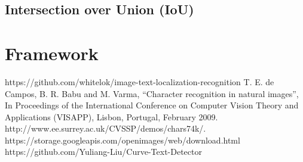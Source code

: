 \documentclass[conference]{IEEEtran}
\begin{document}
\subsection{Intersection over Union (IoU)}

\section{Framework}

\begin{thebibliography}{00}
 https://github.com/whitelok/image-text-localization-recognition
 T. E. de Campos, B. R. Babu and M. Varma, ``Character recognition in natural images'', In Proceedings of the International Conference on Computer Vision Theory and Applications (VISAPP), Lisbon, Portugal, February 2009. http://www.ee.surrey.ac.uk/CVSSP/demos/chars74k/.
 https://storage.googleapis.com/openimages/web/download.html
 https://github.com/Yuliang-Liu/Curve-Text-Detector
\end{thebibliography}
\end{document}
